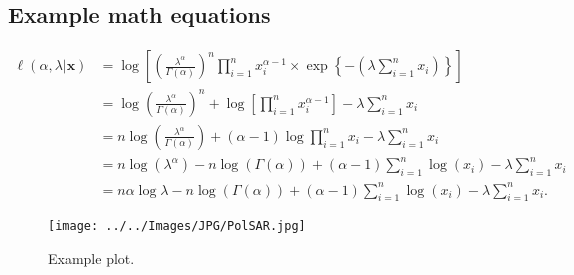 \subsection*{Example math equations}
\begin{align}
\label{eq:em}
\ell(\alpha, \lambda| \bm{x}) &=\log\left[\left(\frac{\lambda^{\alpha}}{\Gamma(\alpha)}\right)^n\prod_{i=1}^nx_i^{\alpha-1}\times \exp\left\{-\left(\lambda\sum_{i=1}^n x_i \right)\right\}\right]\nonumber\\
&=\log\left(\frac{\lambda^{\alpha}}{\Gamma(\alpha)}\right)^n+\log\left[\prod_{i=1}^nx_i^{\alpha-1}\right]-\lambda\sum_{i=1}^nx_i\nonumber\\
&=n\log\left(\frac{\lambda^{\alpha}}{\Gamma(\alpha)}\right)+(\alpha-1)\log\prod_{i=1}^nx_i-\lambda\sum_{i=1}^nx_i\nonumber\\
&=n\log(\lambda^{\alpha})-n\log(\Gamma(\alpha))+(\alpha-1)\sum_{i=1}^n\log(x_i)-\lambda\sum_{i=1}^nx_i\nonumber\\
&=n\alpha\log \lambda -n\log(\Gamma(\alpha)) +(\alpha-1)\sum_{i=1}^n\log(x_i)-\lambda\sum_{i=1}^nx_i.
	\end{align}
\begin{figure}[H]
    \centering
    \texttt{[image: ../../Images/JPG/PolSAR.jpg]}
    \decoRule
    \caption[Example plot]{Example plot.}
    \label{fig:undercatch}
\end{figure}


